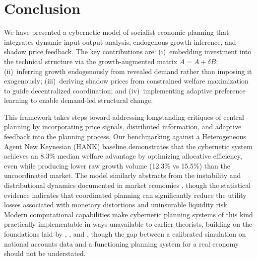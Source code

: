 \section{Conclusion}
\label{sec:conclusion}

We have presented a cybernetic model of socialist economic planning
that integrates dynamic input-output analysis, endogenous growth
inference, and shadow price feedback.
The key contributions are:
(i)~embedding investment into the technical structure via the
growth-augmented matrix $\bar{A} = A + \delta B$;
(ii)~inferring growth endogenously from revealed demand rather than
imposing it exogenously;
(iii)~deriving shadow prices from constrained welfare maximization to
guide decentralized coordination;
and (iv)~implementing adaptive preference learning to enable
demand-led structural change.

This framework takes steps toward addressing longstanding critiques of central planning \citep{hayek1945use, kornai1992socialist} by incorporating price signals, distributed information, and adaptive feedback into the planning process. Our benchmarking against a Heterogeneous Agent New Keynesian (HANK) baseline demonstrates that the cybernetic system achieves an 8.3\% median welfare advantage by optimizing allocative efficiency, even while producing lower raw growth volume (12.3\% vs 15.5\%) than the uncoordinated market. The model similarly abstracts from the instability and distributional dynamics documented in market economies \citep{minsky1986stabilizing, kalecki1971selected}, though the statistical evidence indicates that coordinated planning can significantly reduce the utility losses associated with monetary distortions and uninsurable liquidity risk. Modern computational capabilities make cybernetic planning systems of this kind practically implementable in ways unavailable to earlier theorists, building on the foundations laid by \citet{lange1936economic}, \citet{kantorovich1965best}, and \citet{leontief1986input}, though the gap between a calibrated simulation on national accounts data and a functioning planning system for a real economy should not be understated.